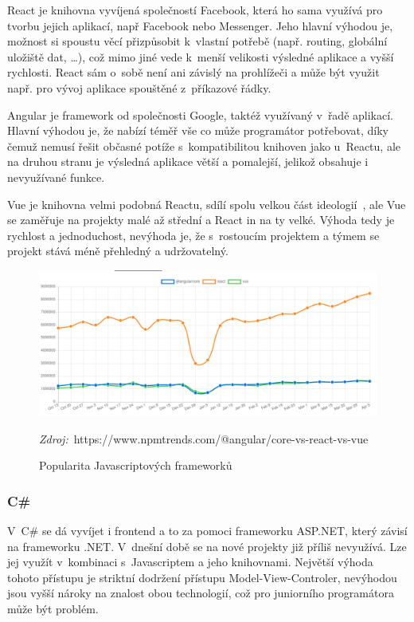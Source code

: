 React je knihovna vyvíjená společností Facebook, která ho sama využívá pro tvorbu jejich aplikací, např Facebook nebo Messenger. Jeho hlavní výhodou je, možnost si spoustu věcí přizpůsobit k~vlastní potřebě (např. routing, globální uložiště dat, \ldots{}), což mimo jiné vede k~menší velikosti výsledné aplikace a vyšší rychlosti. React sám o~sobě není ani závislý na prohlížeči a může být využit např. pro vývoj aplikace spouštěné z~příkazové řádky.

Angular je framework od společnosti Google, taktéž využívaný v~řadě aplikací. Hlavní výhodou je, že nabízí téměř vše co může programátor potřebovat, díky čemuž nemusí řešit občasné potíže s~kompatibilitou knihoven jako u~Reactu, ale na druhou stranu je výsledná aplikace větší a pomalejší, jelikož obsahuje i nevyužívané funkce.

Vue je knihovna velmi podobná Reactu, sdílí spolu velkou část ideologií~\cite{you_2014_comparison}, ale Vue se zaměřuje na projekty malé až střední a React in na ty velké. Výhoda tedy je rychlost a jednoduchost, nevýhoda je, že s~rostoucím projektem a týmem se projekt stává méně přehledný a udržovatelný.

\begin{figure}[h!]
    \centering
    \includegraphics[width=\textwidth]{assets/popularity_plot.png}
    \caption{Popularita Javascriptových frameworků}
    \label{fig:popularity_plot}
    \textit{Zdroj:}~https://www.npmtrends.com/@angular/core-vs-react-vs-vue
\end{figure}

\subsubsection*{C\# }
V~C\# se dá vyvíjet i frontend a to za pomoci frameworku ASP.NET, který závisí na frameworku .NET. V~dnešní době se na nové projekty již příliš nevyužívá. Lze jej využít v~kombinaci s~Javascriptem a jeho knihovnami. Největší výhoda tohoto přístupu je striktní dodržení přístupu Model-View-Controler, nevýhodou jsou vyšší nároky na znalost obou technologií, což pro juniorního programátora může být problém.

